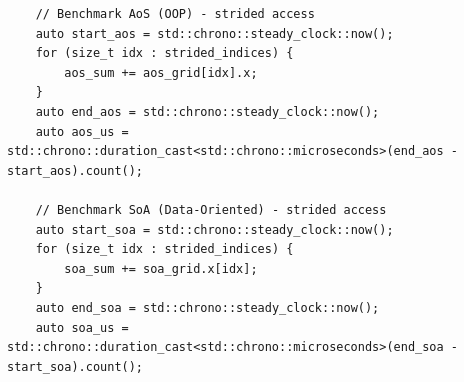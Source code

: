 \begin{verbatim}
    // Benchmark AoS (OOP) - strided access
    auto start_aos = std::chrono::steady_clock::now();
    for (size_t idx : strided_indices) {
        aos_sum += aos_grid[idx].x;
    }
    auto end_aos = std::chrono::steady_clock::now();
    auto aos_us = std::chrono::duration_cast<std::chrono::microseconds>(end_aos - start_aos).count();

    // Benchmark SoA (Data-Oriented) - strided access
    auto start_soa = std::chrono::steady_clock::now();
    for (size_t idx : strided_indices) {
        soa_sum += soa_grid.x[idx];
    }
    auto end_soa = std::chrono::steady_clock::now();
    auto soa_us = std::chrono::duration_cast<std::chrono::microseconds>(end_soa - start_soa).count();
\end{verbatim}
